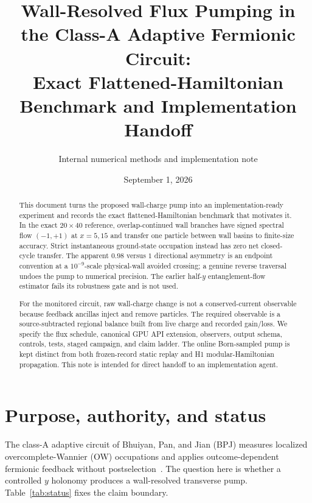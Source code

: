 \documentclass[aps,prb,onecolumn,nofootinbib,superscriptaddress]{revtex4-2}
\begin{document}
\title{\texorpdfstring{Wall-Resolved Flux Pumping in the Class-A Adaptive Fermionic Circuit:\\
Exact Flattened-Hamiltonian Benchmark and Implementation Handoff}%
{Wall-Resolved Flux Pumping in the Class-A Adaptive Fermionic Circuit: Exact Benchmark and Implementation Handoff}}
\author{Internal numerical methods and implementation note}
\date{September 1, 2026}

\begin{abstract}
This document turns the proposed wall-charge pump into an implementation-ready
experiment and records the exact flattened-Hamiltonian benchmark that motivates
it.  In the exact $20\times40$ reference, overlap-continued wall branches have
signed spectral flow $(-1,+1)$ at $x=5,15$ and transfer one particle between
wall basins to finite-size accuracy.  Strict instantaneous ground-state
occupation instead has zero net closed-cycle transfer.  The apparent $0.98$
versus $1$ directional asymmetry is an endpoint convention at a
$10^{-9}$-scale physical-wall avoided crossing; a genuine reverse traversal
undoes the pump to numerical precision.  The earlier half-$y$
entanglement-flow estimator fails its robustness gate and is not used.

For the monitored circuit, raw wall-charge change is not a conserved-current
observable because feedback ancillas inject and remove particles.  The required
observable is a source-subtracted regional balance built from live charge and
recorded gain/loss.  We specify the flux schedule, canonical GPU API extension,
observers, output schema, controls, tests, staged campaign, and claim ladder.
The online Born-sampled pump is kept distinct from both frozen-record static
replay and H1 modular-Hamiltonian propagation.  This note is intended for
direct handoff to an implementation agent.
\end{abstract}

\maketitle
\setcounter{tocdepth}{2}
\tableofcontents

\section{Purpose, authority, and status}
\label{sec:purpose}

The class-A adaptive circuit of Bhuiyan, Pan, and Jian (BPJ) measures localized
overcomplete-Wannier (OW) occupations and applies outcome-dependent fermionic
feedback without postselection~\cite{BhuiyanPanJian2026}.  The question here is
whether a controlled $y$ holonomy produces a wall-resolved transverse pump.
Table~\ref{tab:status} fixes the claim boundary.
\end{document}
